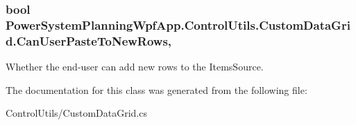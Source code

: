 \subsubsection[{\texorpdfstring{Can\+User\+Paste\+To\+New\+Rows}{CanUserPasteToNewRows}}]{\setlength{\rightskip}{0pt plus 5cm}bool Power\+System\+Planning\+Wpf\+App.\+Control\+Utils.\+Custom\+Data\+Grid.\+Can\+User\+Paste\+To\+New\+Rows\hspace{0.3cm}{\ttfamily [get]}, {\ttfamily [set]}}\hypertarget{class_power_system_planning_wpf_app_1_1_control_utils_1_1_custom_data_grid_a3444d83edb40c95ccf9aca14ffe6f3ce}{}\label{class_power_system_planning_wpf_app_1_1_control_utils_1_1_custom_data_grid_a3444d83edb40c95ccf9aca14ffe6f3ce}


Whether the end-\/user can add new rows to the Items\+Source. 



The documentation for this class was generated from the following file\+:\begin{DoxyCompactItemize}
\item 
Control\+Utils/Custom\+Data\+Grid.\+cs\end{DoxyCompactItemize}
